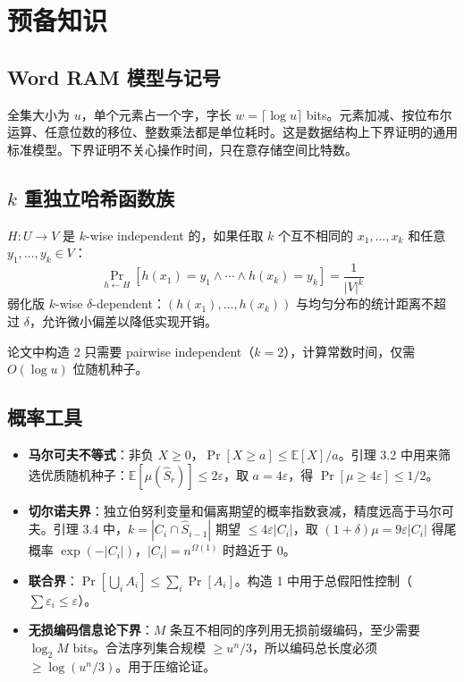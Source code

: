 \documentclass[UTF8,11pt,a4paper]{ctexart}
\newcommand{\E}{\mathbb{E}}
\begin{document}
\section{预备知识}

\subsection{Word RAM 模型与记号}

全集大小为 $u$，单个元素占一个字，字长 $w = \lceil\log u\rceil$ bits。元素加减、按位布尔运算、任意位数的移位、整数乘法都是单位耗时。这是数据结构上下界证明的通用标准模型。下界证明不关心操作时间，只在意存储空间比特数。

\subsection{$k$ 重独立哈希函数族}

$H: U \to V$ 是 $k$-wise independent 的，如果任取 $k$ 个互不相同的 $x_1, \dots, x_k$ 和任意 $y_1, \dots, y_k \in V$：
\[
\Pr_{h \leftarrow H}[h(x_1)=y_1 \wedge \cdots \wedge h(x_k)=y_k] = \frac{1}{|V|^k}
\]
弱化版 $k$-wise $\delta$-dependent：$(h(x_1), \dots, h(x_k))$ 与均匀分布的统计距离不超过 $\delta$，允许微小偏差以降低实现开销。

论文中构造 2 只需要 pairwise independent（$k=2$），计算常数时间，仅需 $O(\log u)$ 位随机种子。

\subsection{概率工具}

\begin{itemize}
    \item \textbf{马尔可夫不等式}：非负 $X \ge 0$，$\Pr[X \ge a] \le \E[X]/a$。引理 3.2 中用来筛选优质随机种子：$\E[\mu(\hat{S}_r)] \le 2\varepsilon$，取 $a = 4\varepsilon$，得 $\Pr[\mu \ge 4\varepsilon] \le 1/2$。
    \item \textbf{切尔诺夫界}：独立伯努利变量和偏离期望的概率指数衰减，精度远高于马尔可夫。引理 3.4 中，$k = |C_i \cap \hat{S}_{i-1}|$ 期望 $\le 4\varepsilon|C_i|$，取 $(1+\delta)\mu = 9\varepsilon|C_i|$ 得尾概率 $\exp(-|C_i|)$，$|C_i| = n^{\Omega(1)}$ 时趋近于 0。
    \item \textbf{联合界}：$\Pr[\bigcup_i A_i] \le \sum_i \Pr[A_i]$。构造 1 中用于总假阳性控制（$\sum \varepsilon_i \le \varepsilon$）。
    \item \textbf{无损编码信息论下界}：$M$ 条互不相同的序列用无损前缀编码，至少需要 $\log_2 M$ bits。合法序列集合规模 $\ge u^n/3$，所以编码总长度必须 $\ge \log(u^n/3)$。用于压缩论证。
\end{itemize}
\end{document}
